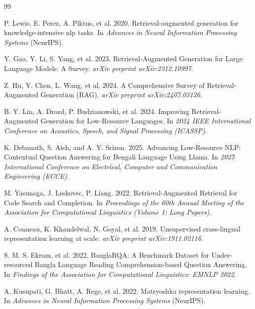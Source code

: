 \documentclass[manuscript,screen,review]{acmart}
\begin{document}
\begin{thebibliography}{99}

    P. Lewis, E. Perez, A. Piktus, et al. 2020. Retrieval-augmented generation for knowledge-intensive nlp tasks. In \emph{Advances in Neural Information Processing Systems} (NeurIPS).
    
    Y. Gao, Y. Li, S. Yang, et al. 2023. Retrieval-Augmented Generation for Large Language Models: A Survey. \emph{arXiv preprint arXiv:2312.10997}.

    Z. Hu, Y. Chen, L. Wang, et al. 2024. A Comprehensive Survey of Retrieval-Augmented Generation (RAG). \emph{arXiv preprint arXiv:2407.03126}.

    B. Y. Lin, A. Drozd, P. Budzianowski, et al. 2024. Improving Retrieval-Augmented Generation for Low-Resource Languages. In \emph{2024 IEEE International Conference on Acoustics, Speech, and Signal Processing (ICASSP)}.

    K. Debanath, S. Aich, and A. Y. Srizon. 2025. Advancing Low-Resource NLP: Contextual Question Answering for Bengali Language Using Llama. In \emph{2025 International Conference on Electrical, Computer and Communication Engineering (ECCE)}.
    
    M. Yasunaga, J. Leskovec, P. Liang. 2022. Retrieval-Augmented Retrieval for Code Search and Completion. In \emph{Proceedings of the 60th Annual Meeting of the Association for Computational Linguistics (Volume 1: Long Papers)}.

    A. Conneau, K. Khandelwal, N. Goyal, et al. 2019. Unsupervised cross-lingual representation learning at scale. \emph{arXiv preprint arXiv:1911.02116}.
    
    S. M. S. Ekram, et al. 2022. BanglaRQA: A Benchmark Dataset for Under-resourced Bangla Language Reading Comprehension-based Question Answering. In \emph{Findings of the Association for Computational Linguistics: EMNLP 2022}.
    
    A. Kusupati, G. Bhatt, A. Rege, et al. 2022. Matryoshka representation learning. In \emph{Advances in Neural Information Processing Systems} (NeurIPS).
    

\end{thebibliography}
\end{document}
